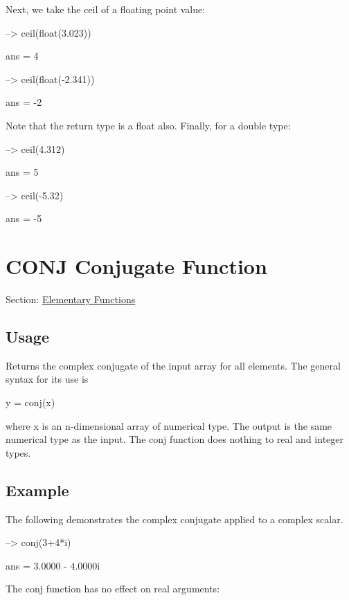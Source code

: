 Next, we take the {\ttfamily ceil} of a floating point value\-:


\begin{DoxyVerbInclude}
--> ceil(float(3.023))

ans = 
 4 

--> ceil(float(-2.341))

ans = 
 -2 
\end{DoxyVerbInclude}


Note that the return type is a {\ttfamily float} also. Finally, for a {\ttfamily double} type\-:


\begin{DoxyVerbInclude}
--> ceil(4.312)

ans = 
 5 

--> ceil(-5.32)

ans = 
 -5 
\end{DoxyVerbInclude}
 \hypertarget{elementary_conj}{}\section{C\-O\-N\-J Conjugate Function}\label{elementary_conj}
Section\-: \hyperlink{sec_elementary}{Elementary Functions} \hypertarget{vtkwidgets_vtkxyplotwidget_Usage}{}\subsection{Usage}\label{vtkwidgets_vtkxyplotwidget_Usage}
Returns the complex conjugate of the input array for all elements. The general syntax for its use is \begin{DoxyVerb}   y = conj(x)
\end{DoxyVerb}
 where {\ttfamily x} is an {\ttfamily n}-\/dimensional array of numerical type. The output is the same numerical type as the input. The {\ttfamily conj} function does nothing to real and integer types. \hypertarget{variables_struct_Example}{}\subsection{Example}\label{variables_struct_Example}
The following demonstrates the complex conjugate applied to a complex scalar.


\begin{DoxyVerbInclude}
--> conj(3+4*i)

ans = 
   3.0000 -  4.0000i 
\end{DoxyVerbInclude}


The {\ttfamily conj} function has no effect on real arguments\-:


